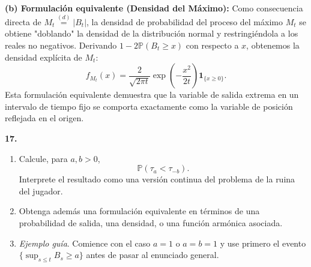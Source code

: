 \documentclass[11pt, letterpaper]{article}
\begin{document}
\begin{solucion}
    \textbf{(b) Formulación equivalente (Densidad del Máximo):}
    Como consecuencia directa de $M_t \stackrel{(d)}{=} |B_t|$, la densidad de probabilidad del proceso del máximo $M_t$ se obtiene "doblando" la densidad de la distribución normal y restringiéndola a los reales no negativos. Derivando $1 - 2\mathbb{P}(B_t \ge x)$ con respecto a $x$, obtenemos la densidad explícita de $M_t$:
    \[ f_{M_t}(x) = \frac{2}{\sqrt{2\pi t}} \exp\left( -\frac{x^2}{2t} \right) \mathbf{1}_{\{x \ge 0\}}. \]
    Esta formulación equivalente demuestra que la variable de salida extrema en un intervalo de tiempo fijo se comporta exactamente como la variable de posición reflejada en el origen.
\end{solucion}

\newpage

\begin{ejercicio}
    \textbf{17.} 
    \begin{enumerate}
        \item Calcule, para $a, b > 0$,
        \[ \mathbb{P}(\tau_a < \tau_{-b}). \]
        Interprete el resultado como una versión continua del problema de la ruina del jugador.
        \item Obtenga además una formulación equivalente en términos de una probabilidad de salida, una densidad, o una función armónica asociada.
        \item \textit{Ejemplo guía}. Comience con el caso $a = 1$ o $a = b = 1$ y use primero el evento $\{\sup_{s \le t} B_s \ge a\}$ antes de pasar al enunciado general.
    \end{enumerate}
\end{ejercicio}

\vspace{5mm}
\end{document}
